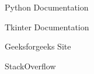 \cleardoublepage
{}
{}
\begin{thebibliography}{99}

Python Documentation

Tkinter Documentation

Geeksforgeeks Site

StackOverflow

\end{thebibliography}
